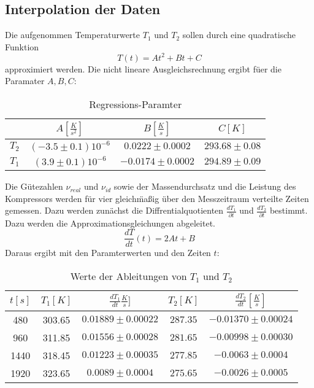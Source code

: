 \documentclass[11pt]{article}
\begin{document}
\subsection{Interpolation der Daten}
Die aufgenommen Temperaturwerte $T_1$ und $T_2$ sollen durch eine quadratische Funktion
\begin{equation}
T(t) = At^2 + Bt + C
\end{equation}
approximiert werden. Die  nicht lineare Ausgleichsrechnung ergibt f\"uer die Paramater $A, B, C$:
\begin{table}[H]
\centering
\begin{tabular}{c|c|c|c}

& $A [\frac{K}{s^2}]$ & $B [\frac{K}{s}]$ & $C [K]$ \\
\hline
$T_2$& $(-3.5\pm0.1)10^{-6}$ & $0.0222\pm0.0002$ &$ 293.68\pm0.08$\\
$T_1$ & $(3.9\pm0.1)10^{-6}$ & $-0.0174\pm0.0002$ & $294.89\pm0.09$\\
\end{tabular}
\caption{Regressions-Paramter}
\end{table} \noindent
Die  G\"utezahlen $\nu_{real}$ und $\nu_{id}$ sowie der Massendurchsatz und die Leistung des Kompressors werden f\"ur vier gleich\"ma\ss ig \"uber den Messzeitraum verteilte Zeiten gemessen. Dazu werden zun\"achst die Diffrentialquotienten $\frac{d T_1}{\partial t}$ und $\frac{dT_2}{\partial t}$ bestimmt. Dazu werden die Approximationsgleichungen abgeleitet. 
\begin{equation}
\frac{dT}{dt}(t) = 2At + B
\end{equation}
Daraus ergibt mit den Paramterwerten und den Zeiten $t$:
\begin{table}[H]
\centering 
\begin{tabular}{c|c|c|c|c}
\hline
$t [s]$ & $T_1 [K]$ & $\frac{dT_1}{dt} \frac{K}{s}]$ & $T_2 [K]$ & $\frac{dT_2}{dt} [\frac Ks]$  \\
\hline
480 & 303.65 & $0.01889\pm0.00022$ & $287.35$ & $-0.01370\pm0.00024 $\\
960 & 311.85 & $0.01556\pm0.00028$ & $281.65$ &$ -0.00998\pm0.00030$ \\
1440 & 318.45 & $0.01223\pm0.00035$ &$ 277.85$ & $-0.0063\pm0.0004$ \\
1920 & 323.65 & $0.0089\pm0.0004$ & $275.65$ &$ -0.0026\pm0.0005$ \\

\end{tabular}
\caption{Werte der Ableitungen von $T_1$ und $T_2$}
\end{table}
\end{document}

